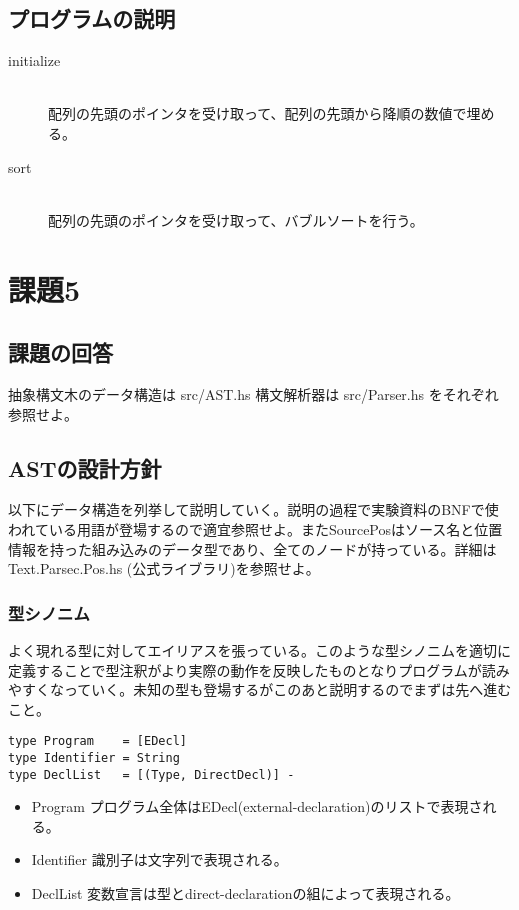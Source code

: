 \documentclass{jsarticle}
\begin{document}
\subsection{プログラムの説明}
\begin{description}
\item[initialize] \mbox{} \\
配列の先頭のポインタを受け取って、配列の先頭から降順の数値で埋める。
\item[sort] \mbox{} \\
 配列の先頭のポインタを受け取って、バブルソートを行う。
\end{description}

\section{課題5}
\subsection{課題の回答}
抽象構文木のデータ構造は src/AST.hs 構文解析器は src/Parser.hs をそれぞれ参照せよ。

\subsection{ASTの設計方針}
以下にデータ構造を列挙して説明していく。説明の過程で実験資料のBNFで使われている用語が登場するので適宜参照せよ。またSourcePosはソース名と位置情報を持った組み込みのデータ型であり、全てのノードが持っている。詳細は Text.Parsec.Pos.hs (公式ライブラリ)を参照せよ。

\subsubsection{型シノニム}
よく現れる型に対してエイリアスを張っている。このような型シノニムを適切に定義することで型注釈がより実際の動作を反映したものとなりプログラムが読みやすくなっていく。未知の型も登場するがこのあと説明するのでまずは先へ進むこと。
\begin{verbatim}
type Program    = [EDecl]
type Identifier = String
type DeclList   = [(Type, DirectDecl)] -
\end{verbatim}
\begin{itemize}
\item Program プログラム全体はEDecl(external-declaration)のリストで表現される。
\item Identifier 識別子は文字列で表現される。
\item DeclList 変数宣言は型とdirect-declarationの組によって表現される。
\end{itemize}
\end{document}
